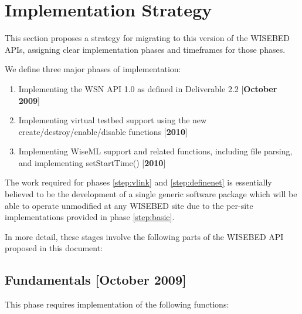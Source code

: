 	\section{Implementation Strategy}
	\label{sec:implstrategy}
This section proposes a strategy for migrating to this version of the WISEBED APIs, assigning clear implementation phases and timeframes for those phases.

We define three major phases of implementation:

\begin{enumerate}

	\item Implementing the WSN API 1.0 as defined in Deliverable 2.2 [{\bf October 2009}]
	\label{step:basic}
	
	\item Implementing virtual testbed support using the new create/destroy/enable/disable functions [{\bf 2010}]
	\label{step:vlink}
	
	\item Implementing WiseML support and related functions, including file parsing, and implementing setStartTime() [{\bf 2010}]
	\label{step:definenet}
	
\end{enumerate}

The work required for phases \ref{step:vlink} and \ref{step:definenet} is essentially believed to be the development of a single generic software package which will be able to operate unmodified at any WISEBED site due to the per-site implementations provided in phase \ref{step:basic}.

In more detail, these stages involve the following parts of the WISEBED API proposed in this document:

		\subsection{Fundamentals [October 2009]}
This phase requires implementation of the following functions:

